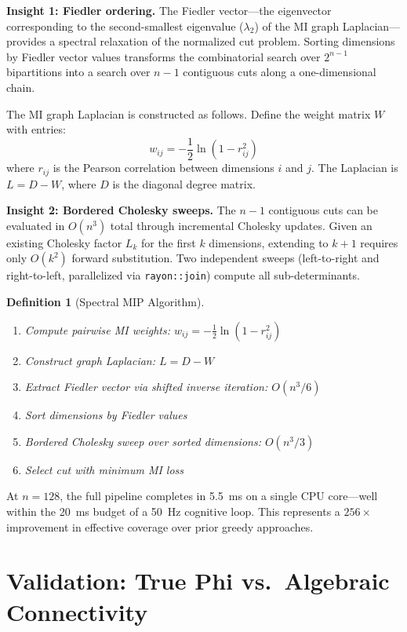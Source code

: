 \documentclass[12pt]{book}
\newtheorem{definition}[theorem]{Definition}
\begin{document}
\textbf{Insight 1: Fiedler ordering.} The Fiedler vector---the eigenvector corresponding to the second-smallest eigenvalue ($\lambda_2$) of the MI graph Laplacian---provides a spectral relaxation of the normalized cut problem. Sorting dimensions by Fiedler vector values transforms the combinatorial search over $2^{n-1}$ bipartitions into a search over $n - 1$ contiguous cuts along a one-dimensional chain.

The MI graph Laplacian is constructed as follows. Define the weight matrix $W$ with entries:
\begin{equation}\label{eq:mi-weight}
w_{ij} = -\frac{1}{2}\ln(1 - r_{ij}^2)
\end{equation}
where $r_{ij}$ is the Pearson correlation between dimensions $i$ and $j$. The Laplacian is $L = D - W$, where $D$ is the diagonal degree matrix.

\textbf{Insight 2: Bordered Cholesky sweeps.} The $n - 1$ contiguous cuts can be evaluated in $O(n^3)$ total through incremental Cholesky updates. Given an existing Cholesky factor $L_k$ for the first $k$ dimensions, extending to $k + 1$ requires only $O(k^2)$ forward substitution. Two independent sweeps (left-to-right and right-to-left, parallelized via \texttt{rayon::join}) compute all sub-determinants.

\begin{definition}[Spectral MIP Algorithm]\label{def:spectral-mip}
\begin{enumerate}
  \item Compute pairwise MI weights: $w_{ij} = -\frac{1}{2}\ln(1 - r_{ij}^2)$
  \item Construct graph Laplacian: $L = D - W$
  \item Extract Fiedler vector via shifted inverse iteration: $O(n^3/6)$
  \item Sort dimensions by Fiedler values
  \item Bordered Cholesky sweep over sorted dimensions: $O(n^3/3)$
  \item Select cut with minimum MI loss
\end{enumerate}
\end{definition}

At $n = 128$, the full pipeline completes in 5.5~ms on a single CPU core---well within the 20~ms budget of a 50~Hz cognitive loop. This represents a $256\times$ improvement in effective coverage over prior greedy approaches.

\section{Validation: True Phi vs.\ Algebraic Connectivity}
\end{document}
